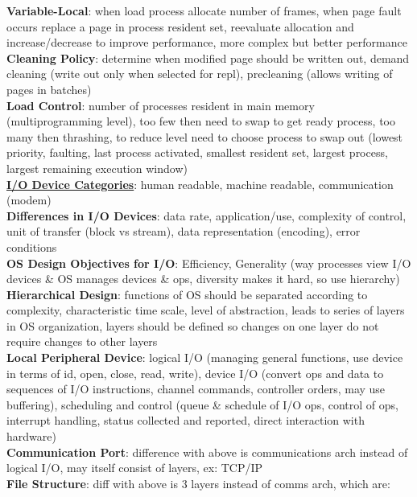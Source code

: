 \documentclass[a4paper]{article}
\begin{document}
\begin{multicols}{2}
        \textbf{Variable-Local}: when load process allocate number of frames, when page fault occurs replace a page in process resident set, reevaluate allocation and increase/decrease to improve performance, more complex but better performance\\
        \textbf{Cleaning Policy}: determine when modified page should be written out, demand cleaning (write out only when selected for repl), precleaning (allows writing of pages in batches)\\
        \textbf{Load Control}: number of processes resident in main memory (multiprogramming level), too few then need to swap to get ready process, too many then thrashing, to reduce level need to choose process to swap out (lowest priority, faulting, last process activated, smallest resident set, largest process, largest remaining execution window)\\
        \underline{\textbf{I/O Device Categories}}: human readable, machine readable, communication (modem)\\
        \textbf{Differences in I/O Devices}: data rate, application/use, complexity of control, unit of transfer (block vs stream), data representation (encoding), error conditions\\
        \textbf{OS Design Objectives for I/O}: Efficiency, Generality (way processes view I/O devices \& OS manages devices \& ops, diversity makes it hard, so use hierarchy)\\
        \textbf{Hierarchical Design}: functions of OS should be separated according to complexity, characteristic time scale, level of abstraction, leads to series of layers in OS organization, layers should be defined so changes on one layer do not require changes to other layers\\
        \textbf{Local Peripheral Device}: logical I/O (managing general functions, use device in terms of id, open, close, read, write), device I/O (convert ops and data to sequences of I/O instructions, channel commands, controller orders, may use buffering), scheduling and control (queue \& schedule of I/O ops, control of ops, interrupt handling, status collected and reported, direct interaction with hardware)\\
        \textbf{Communication Port}: difference with above is communications arch instead of logical I/O, may itself consist of layers, ex: TCP/IP\\
        \textbf{File Structure}: diff with above is 3 layers instead of comms arch, which are:\\

\end{multicols}
\end{document}
